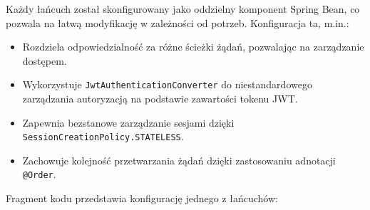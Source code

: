 \noindent
Każdy łańcuch został skonfigurowany jako oddzielny komponent Spring Bean, co pozwala na łatwą modyfikację w zależności od potrzeb. Konfiguracja ta, m.in.:
\begin{itemize}
    \item Rozdziela odpowiedzialność za różne ścieżki żądań, pozwalając na zarządzanie dostępem.
    \item Wykorzystuje \texttt{JwtAuthenticationConverter} do niestandardowego zarządzania autoryzacją na podstawie zawartości tokenu JWT.
    \item Zapewnia bezstanowe zarządzanie sesjami dzięki \texttt{SessionCreationPolicy.STATELESS}.
    \item Zachowuje kolejność przetwarzania żądań dzięki zastosowaniu adnotacji \texttt{@Order}.
\end{itemize}

\noindent Fragment kodu przedstawia konfigurację jednego z łańcuchów:

